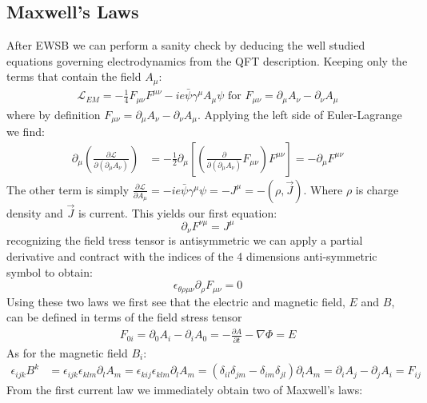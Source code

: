 \subsection{Maxwell's Laws} 

After EWSB we can perform a sanity check by deducing the well studied equations governing
 electrodynamics from the QFT description. Keeping only the terms that contain the field $A_\mu$:
\begin{align*}
\mathcal{L}_{EM} = -\frac{1}{4} F_{\mu\nu} F^{\mu\nu}  - ie \bar{\psi} \gamma^\mu A_\mu \psi \text{ for } F_{\mu\nu} = \partial_\mu A_\nu - \partial_\nu A_\mu 
\end{align*}
where by definition $F_{\mu\nu} = \partial_\mu A_\nu - \partial_\nu A_\mu$. Applying the left side of Euler-Lagrange we find:
\begin{align*}
\partial_\mu \left (\frac{\partial \mathcal L}{\partial(\partial_\mu A_\nu)} \right) &=  
-\frac{1}{2}\partial_\mu \left [ \left (\frac{\partial}{\partial(\partial_\mu A_\nu)} F_{\mu\nu} \right) F^{\mu\nu} \right ] 
= -  \partial_\mu F^{\mu\nu}
\end{align*}
The other term is simply $\frac{\partial \mathcal L}{\partial A_\mu} = -ie \bar \psi \gamma^\mu  \psi = - J^\mu = -(\rho, \vec J)$. Where $\rho$ is charge
density and $\vec J$ is current. This yields our first equation:
\begin{equation}
\partial_\nu F^{\nu\mu} = J^\mu
\end{equation}
recognizing the field tress tensor is antisymmetric we can apply a partial derivative and contract with the indices of the 4 dimensions anti-symmetric symbol
to obtain:
\begin{equation}
\epsilon_{\theta\rho\mu\nu} \partial_{\rho} F_{\mu\nu} = 0 
\end{equation}
Using these two laws we first see that the electric and magnetic field, $E$ and $B$, can be
defined in terms of the field stress tensor
\begin{align*}
F_{0i} = \partial_0 A_i - \partial_i A_0 = -\frac{\partial A}{\partial t} - \nabla \Phi = E
\end{align*}
As for the magnetic field $B_i$:
\begin{align*}
\epsilon_{ijk}B^k &= \epsilon_{ijk} \epsilon_{klm} \partial_l A_m = \epsilon_{kij} \epsilon_{klm} \partial_l A_m = (\delta_{il} \delta_{jm} - \delta_{im}\delta_{jl}) \partial_l A_m = \partial_i A_j - \partial_j A_i = F_{ij}
\end{align*}
From the first current law we immediately obtain two of Maxwell's laws:
